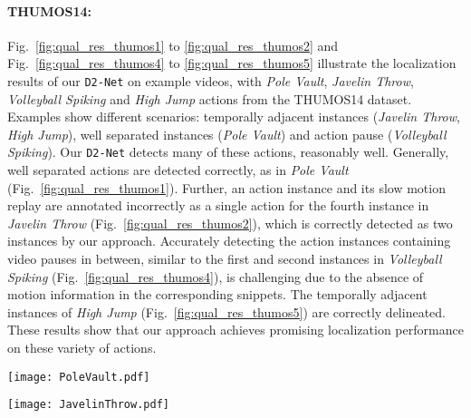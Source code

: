 \documentclass[10pt,twocolumn,letterpaper]{article}
\def\proposed{\texttt{D2-Net}{}}
\begin{document}
\paragraph{THUMOS14:} Fig.~\ref{fig:qual_res_thumos1} to \ref{fig:qual_res_thumos2} and Fig.~\ref{fig:qual_res_thumos4} to \ref{fig:qual_res_thumos5} illustrate the localization results of our \proposed{} on example videos, with \textit{Pole Vault}, \textit{Javelin Throw}, \textit{Volleyball Spiking} and \textit{High Jump} actions from the THUMOS14 dataset. Examples show different scenarios: temporally adjacent instances (\textit{Javelin Throw}, \textit{High Jump}), well separated instances (\textit{Pole Vault}) and action pause (\textit{Volleyball Spiking}). Our \proposed{} detects many of these actions, reasonably well. Generally, well separated actions are detected correctly, as in \textit{Pole Vault} (Fig.~\ref{fig:qual_res_thumos1}). Further, an action instance and its slow motion replay are annotated incorrectly as a single action for the fourth instance in \textit{Javelin Throw} (Fig.~\ref{fig:qual_res_thumos2}), which is correctly detected as two instances by our approach. Accurately detecting the action instances containing video pauses in between, similar to the first and second instances in \textit{Volleyball Spiking} (Fig.~\ref{fig:qual_res_thumos4}), is challenging due to the absence of motion information in the corresponding snippets. The temporally adjacent instances of \textit{High Jump} (Fig.~\ref{fig:qual_res_thumos5}) are correctly delineated. These results show that our approach achieves promising localization performance on these variety of actions.



\begin{figure*}[t]
    \centering
    \texttt{[image: PoleVault.pdf]}
    \caption{\label{fig:qual_res_thumos1}Well separated action instances of \textit{Pole Vault} are generally accurately detected by our \proposed{}. 
}
\end{figure*}





\begin{figure*}[t]
    \centering
    \texttt{[image: JavelinThrow.pdf]}
    \caption{\label{fig:qual_res_thumos2}Fourth instance of \textit{Javelin Throw} is incorrectly annotated as a single instance though it has two instances: action and its slow motion replay. Our \proposed{} correctly detects the two as separate instances. 
 }
\end{figure*}
\end{document}
